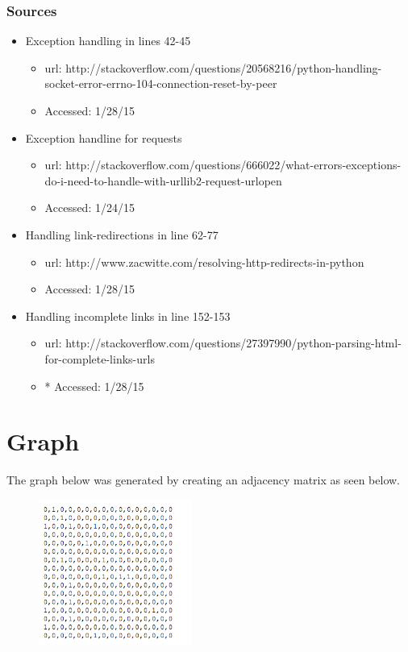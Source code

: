 \documentclass[a4paper,12pt]{article}
\begin{document}
\subsubsection{Sources}
\begin{itemize}
    \item Exception handling in lines 42-45
    \begin{itemize}
        \item 	url: http://stackoverflow.com/questions/20568216/python-handling-socket-error-errno-104-connection-reset-by-peer
        \item Accessed: 1/28/15
    \end{itemize}
	
	\item Exception handline for requests
	\begin{itemize}
	    \item url: http://stackoverflow.com/questions/666022/what-errors-exceptions-do-i-need-to-handle-with-urllib2-request-urlopen
		\item Accessed: 1/24/15
	\end{itemize}
		
			
	\item Handling link-redirections in line 62-77
	\begin{itemize}
	    \item url: http://www.zacwitte.com/resolving-http-redirects-in-python
	    \item Accessed: 1/28/15
	\end{itemize}
		

	\item Handling incomplete links in line 152-153
	\begin{itemize}
	    \item url: http://stackoverflow.com/questions/27397990/python-parsing-html-for-complete-links-urls
	    \item * Accessed: 1/28/15
	\end{itemize}
	
\end{itemize}
\newpage 
\section{Graph}
The graph below was generated by creating an adjacency matrix as seen below. \\
\begin{figure}[h]
\centering
\includegraphics[width=5cm]{adjacencyMatrix}
\end{figure}
\end{document}
